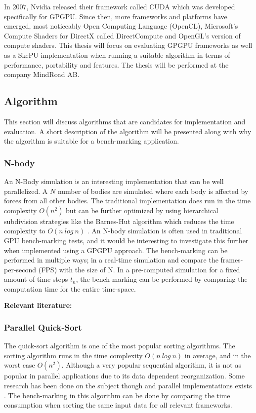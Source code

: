 \documentclass{article}
\begin{document}
In 2007, Nvidia released their framework called CUDA which was developed specifically for GPGPU. Since then, more frameworks and platforms have emerged, most noticeably Open Computing Language (OpenCL), Microsoft's Compute Shaders for DirectX called DirectCompute and OpenGL's version of compute shaders. This thesis will focus on evaluating GPGPU frameworks as well as a SkePU implementation when running a suitable algorithm in terms of performance, portability and features. The thesis will be performed at the company MindRoad AB.

\subsection{Algorithm} \label{subsec:algorithm}
This section will discuss algorithms that are candidates for implementation and evaluation. A short description of the algorithm will be presented along with why the algorithm is suitable for a bench-marking application.

\subsubsection{N-body}
An N-Body simulation is an interesting implementation that can be well parallelized. A $N$ number of bodies are simulated where each body is affected by forces from all other bodies. The traditional implementation does run in the time complexity $O(n^2)$ but can be further optimized by using hierarchical subdivision strategies like the Barnes-Hut algorithm which reduces the time complexity to $O(n \ log \ n)$ \cite{barnes1986hierarchical}. An N-body simulation is often used in traditional GPU bench-marking tests, and it would be interesting to investigate this further when implemented using a GPGPU approach. The bench-marking can be performed in multiple ways; in a real-time simulation and compare the frames-per-second (FPS) with the size of N. In a pre-computed simulation for a fixed amount of time-steps $t_n$, the bench-marking can be performed by comparing the computation time for the entire time-space.

\vspace{5mm}
\noindent \textbf{Relevant literature:} 
\cite{barnes1986hierarchical}
\cite{burtscher2011efficient}
\cite{aarseth2003gravitational}
\cite{hamada2009novel}
\cite{singh1995load}
\cite{nyland2007fast}
\cite{greengard1988rapid}

\subsubsection{Parallel Quick-Sort}
The quick-sort algorithm is one of the most popular sorting algorithms. The sorting algorithm runs in the time complexity  $O(n \ log \ n)$ in average, and in the worst case  $O(n^2)$. Although a very popular sequential algorithm, it is not as popular in parallel applications due to its data dependent reorganization. Some research has been done on the subject though and parallel implementations exists \cite{sanders1997efficient}\cite{tsigas2003simple}\cite{manca2016cuda}. The bench-marking in this algorithm can be done by comparing the time consumption when sorting the same input data for all relevant frameworks.
\end{document}
